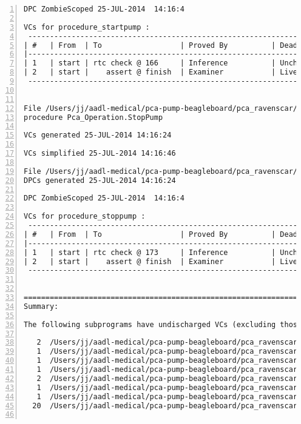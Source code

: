 \begin{lstlisting}[gobble=0, numbers=left, caption={POGS report for PCA Pump prototype}, label={listing:pca_ravenscar:pogs_full}]
DPC ZombieScoped 25-JUL-2014  14:16:4

VCs for procedure_startpump :
 -----------------------------------------------------------------------------
| #   | From  | To                  | Proved By          | Dead Path | Status |
|-----------------------------------------------------------------------------
| 1   | start | rtc check @ 166     | Inference          | Unchecked |   IU   |
| 2   | start |    assert @ finish  | Examiner           | Live      |   EL   |
 -----------------------------------------------------------------------------


File /Users/jj/aadl-medical/pca-pump-beagleboard/pca_ravenscar/pca_operation/stoppump.vcg
procedure Pca_Operation.StopPump

VCs generated 25-JUL-2014 14:16:24

VCs simplified 25-JUL-2014 14:16:46

File /Users/jj/aadl-medical/pca-pump-beagleboard/pca_ravenscar/pca_operation/stoppump.dpc
DPCs generated 25-JUL-2014 14:16:24

DPC ZombieScoped 25-JUL-2014  14:16:4

VCs for procedure_stoppump :
 -----------------------------------------------------------------------------
| #   | From  | To                  | Proved By          | Dead Path | Status |
|-----------------------------------------------------------------------------
| 1   | start | rtc check @ 173     | Inference          | Unchecked |   IU   |
| 2   | start |    assert @ finish  | Examiner           | Live      |   EL   |
 -----------------------------------------------------------------------------


===============================================================================
Summary:

The following subprograms have undischarged VCs (excluding those proved false):

   2  /Users/jj/aadl-medical/pca-pump-beagleboard/pca_ravenscar/pca_operation/get_time_between_activations.vcg
   1  /Users/jj/aadl-medical/pca-pump-beagleboard/pca_ravenscar/pca_operation/integer_array_store/get.vcg
   1  /Users/jj/aadl-medical/pca-pump-beagleboard/pca_ravenscar/pca_operation/integer_array_store/inc.vcg
   1  /Users/jj/aadl-medical/pca-pump-beagleboard/pca_ravenscar/pca_operation/integer_array_store/put.vcg
   2  /Users/jj/aadl-medical/pca-pump-beagleboard/pca_ravenscar/pca_operation/integer_array_store/sum.vcg
   1  /Users/jj/aadl-medical/pca-pump-beagleboard/pca_ravenscar/pca_operation/max_drug_per_hour_watcher.vcg
   1  /Users/jj/aadl-medical/pca-pump-beagleboard/pca_ravenscar/pca_operation/patientbolus.vcg
  20  /Users/jj/aadl-medical/pca-pump-beagleboard/pca_ravenscar/pca_operation/rate_controller.vcg


\end{lstlisting}
